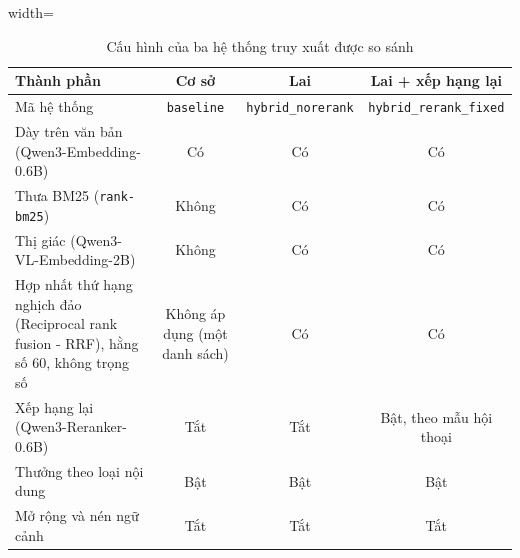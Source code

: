 \begin{table}[ht]
    \centering
    \caption{Cấu hình của ba hệ thống truy xuất được so sánh}
    \label{tab:v7-systems}
    \begin{adjustbox}{width=\textwidth}
        \begin{tabular}{|l|c|c|c|}
            \hline
            \textbf{Thành phần}                        & \textbf{Cơ sở}                & \textbf{Lai}                          & \textbf{Lai + xếp hạng lại} \\
            \hline
            Mã hệ thống                                & \texttt{baseline}             & \texttt{hybrid\_\allowbreak norerank} & \texttt{hybrid\_\allowbreak rerank\_\allowbreak fixed}                 \\
            \hline
            Dày trên văn bản (Qwen3-Embedding-0.6B)    & Có                            & Có                                    & Có                                                                     \\
            \hline
            Thưa BM25 (\texttt{rank-bm25})             & Không                         & Có                                    & Có                                                                     \\
            \hline
            Thị giác (Qwen3-VL-Embedding-2B)           & Không                         & Có                                    & Có                                                                     \\
            \hline
            Hợp nhất thứ hạng nghịch đảo (Reciprocal rank fusion - RRF), hằng số 60, không trọng số & Không áp dụng (một danh sách) & Có                                    & Có                                                                     \\
            \hline
            Xếp hạng lại (Qwen3-Reranker-0.6B)         & Tắt                           & Tắt                                   & Bật, theo mẫu hội thoại                                                \\
            \hline
            Thưởng theo loại nội dung                  & Bật                           & Bật                                   & Bật                                                                    \\
            \hline
            Mở rộng và nén ngữ cảnh                    & Tắt                           & Tắt                                   & Tắt                                                                    \\

\end{tabular}
\end{adjustbox}
\end{table}
